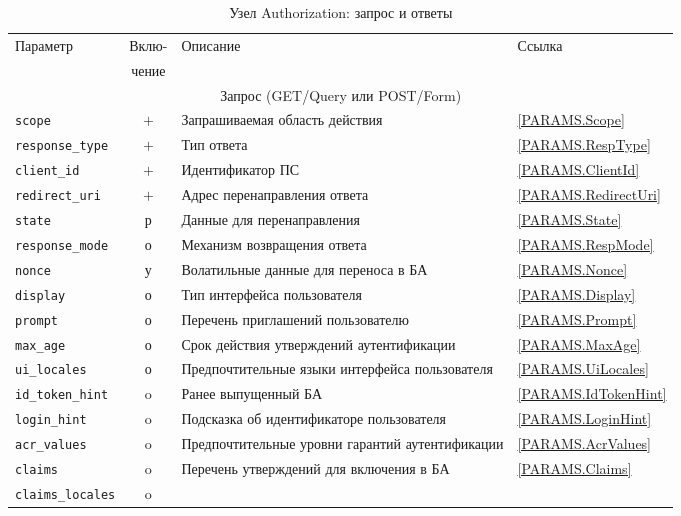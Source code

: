 \begin{table}[p]
\caption{Узел Authorization: запрос и ответы}
\label{Table.OIDC.Authorization} 
\begin{tabular}{|l|c|p{9.0cm}|l|}
\hline
\multirow{2}{*}{Параметр} & Вклю- & \multirow{2}{*}{Описание} & \multirow{2}{*}{Ссылка}\\
                          & чение &&\\
\hline
\hline
\multicolumn{4}{|c|}{Запрос (GET/Query или POST/Form)}\\
\hline
\hline
%
\lstinline!scope! & $+$ & 
Запрашиваемая область действия & 
\ref{PARAMS.Scope}\\
\hline
%
\lstinline!response_type! & $+$ & 
Тип ответа & 
\ref{PARAMS.RespType}\\
\hline
%
\lstinline!client_id! & $+$ & 
Идентификатор ПС & 
\ref{PARAMS.ClientId}\\
\hline
%
\lstinline!redirect_uri! & $+$ &
Адрес перенаправления ответа & 
\ref{PARAMS.RedirectUri}\\
\hline
%
\lstinline!state! & р & 
Данные для перенаправления & 
\ref{PARAMS.State}\\
\hline
%
\lstinline!response_mode! & о & 
Механизм возвращения ответа &
\ref{PARAMS.RespMode}\\
\hline
%
\lstinline!nonce! & у & 
Волатильные данные для переноса в БА &
\ref{PARAMS.Nonce}\\
\hline
%
\lstinline!display! & о & 
Тип интерфейса пользователя &
\ref{PARAMS.Display}\\
\hline
%
\lstinline!prompt! & о & 
Перечень приглашений пользователю &
\ref{PARAMS.Prompt}\\
\hline
%
\lstinline!max_age! & о & 
Срок действия утверждений аутентификации &  
\ref{PARAMS.MaxAge}\\
\hline
%
\lstinline!ui_locales! & о &
Предпочтительные языки интерфейса пользователя & 
\ref{PARAMS.UiLocales}\\
\hline
%
\lstinline!id_token_hint! & o & 
Ранее выпущенный БА & 
\ref{PARAMS.IdTokenHint}\\
\hline
%
\lstinline!login_hint! & o &
Подсказка об идентификаторе пользователя & 
\ref{PARAMS.LoginHint}\\
\hline
%
\lstinline!acr_values! & o & 
Предпочтительные уровни гарантий аутентификации & 
\ref{PARAMS.AcrValues}\\
\hline
%
\lstinline!claims! & o & 
Перечень утверждений для включения в БА & 
\ref{PARAMS.Claims}\\
\hline
%
\lstinline!claims_locales! & o & 

\end{tabular}
\end{table}
